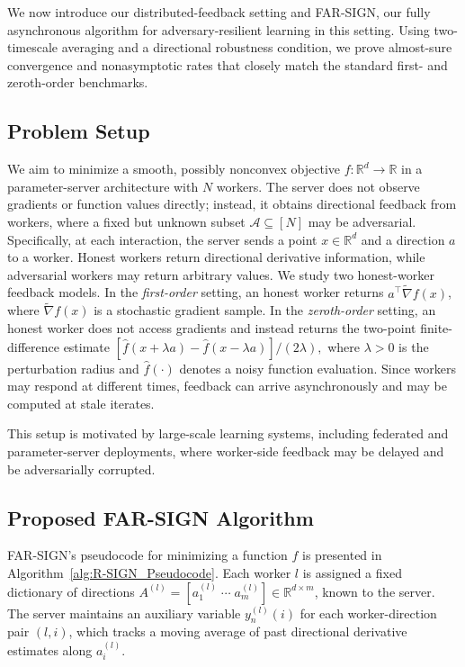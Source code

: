 \documentclass{article}
\newcommand{\farsign}{FAR-SIGN\xspace}
\newcommand{\cA}{\mathcal{A}}
\begin{document}
We now introduce our distributed-feedback setting and \farsign{}, our fully
asynchronous algorithm for adversary-resilient learning in this setting. Using two-timescale averaging and a directional robustness condition, we prove almost-sure
convergence and nonasymptotic rates that closely match the standard first- and
zeroth-order benchmarks.

\subsection{Problem Setup}
%
We aim to minimize a smooth, possibly nonconvex objective
$f:\mathbb{R}^d \to \mathbb{R}$ in a parameter-server architecture with $N$
workers. The server does not observe gradients or function values directly;
instead, it obtains directional feedback from workers, where a fixed but
unknown subset $\cA \subseteq [N]$ may be adversarial. Specifically, at each interaction, the server sends a point $x\in\mathbb{R}^d$ and a
direction $a$ to a worker. Honest workers return directional derivative
information, while adversarial workers may return arbitrary values. We study
two honest-worker feedback models. In the \emph{first-order} setting, an honest
worker returns $a^\top \widetilde{\nabla} f(x)$, where
$\widetilde{\nabla} f(x)$ is a stochastic gradient sample. In the
\emph{zeroth-order} setting, an honest worker does not access gradients and
instead returns the two-point finite-difference estimate $[\hat f(x + \lambda a) - \hat f(x - \lambda a)]/(2 \lambda),$ where $\lambda>0$ is the perturbation radius and $\widehat f(\cdot)$ denotes a
noisy function evaluation. Since
workers may respond at different times, feedback can arrive asynchronously and
may be computed at stale iterates.

This setup is motivated by large-scale learning systems, including
federated and parameter-server deployments, where worker-side feedback may be
delayed and be adversarially corrupted.

\subsection{Proposed \farsign Algorithm}
\label{subsec:farsign}

\farsign's pseudocode for minimizing a function $f$ is presented in Algorithm~\ref{alg:R-SIGN_Pseudocode}. Each worker $l$ is
assigned a fixed dictionary of directions
$A^{(l)}=[a_1^{(l)}\;\cdots\;a_m^{(l)}]\in\mathbb R^{d\times m}$, known to the server. The server maintains an auxiliary variable $y_n^{(l)}(i)$ for each worker-direction pair $(l,i)$, which tracks a moving average of past directional derivative estimates along $a_i^{(l)}$.
\end{document}
